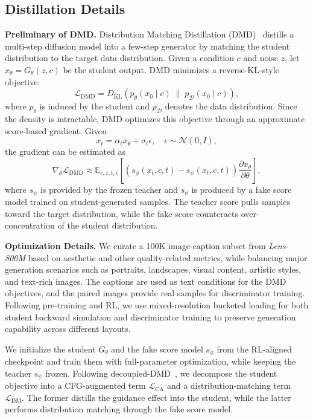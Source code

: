\subsection{Distillation Details}
\label{sec:Distill-Details}

\noindent\textbf{Preliminary of DMD.}
Distribution Matching Distillation (DMD)~\citep{dmd} distills a multi-step diffusion model into a few-step generator by matching the student distribution to the target data distribution. Given a condition $c$ and noise $z$, let $x_\theta=G_\theta(z,c)$ be the student output. DMD minimizes a reverse-KL-style objective:
\begin{equation*}
\mathcal{L}_{\mathrm{DMD}}
=
D_{\mathrm{KL}}
\left(
p_\theta(x_0 \mid c)
\;\|\;
p_{\mathcal{D}}(x_0 \mid c)
\right),
\end{equation*}
where $p_\theta$ is induced by the student and $p_{\mathcal{D}}$ denotes the data distribution. Since the density is intractable, DMD optimizes this objective through an approximate score-based gradient. Given
\begin{equation*}
x_t=\alpha_t x_\theta+\sigma_t\epsilon,
\quad
\epsilon\sim\mathcal{N}(0,I),
\end{equation*}
the gradient can be estimated as
\begin{equation*}
\nabla_\theta \mathcal{L}_{\mathrm{DMD}}
\approx
\mathbb{E}_{c,z,t,\epsilon}
\left[
\left(
s_\phi(x_t,c,t)
-
s_\psi(x_t,c,t)
\right)
\frac{\partial x_\theta}{\partial \theta}
\right],
\end{equation*}
where $s_\psi$ is provided by the frozen teacher and $s_\phi$ is produced by a fake score model trained on student-generated samples. The teacher score pulls samples toward the target distribution, while the fake score counteracts over-concentration of the student distribution.

\noindent\textbf{Optimization Details.}
We curate a 100K image-caption subset from \textit{Lens-800M} based on aesthetic and other quality-related metrics, while balancing major generation scenarios such as portraits, landscapes, visual content, artistic styles, and text-rich images. The captions are used as text conditions for the DMD objectives, and the paired images provide real samples for discriminator training. Following pre-training and RL, we use mixed-resolution bucketed loading for both student backward simulation and discriminator training to preserve generation capability across different layouts.

We initialize the student $G_\theta$ and the fake score model $s_\phi$ from the RL-aligned checkpoint and train them with full-parameter optimization, while keeping the teacher $s_\psi$ frozen. Following decoupled-DMD~\citep{decoupleddmd}, we decompose the student objective into a CFG-augmented term $\mathcal{L}_{\mathrm{CA}}$ and a distribution-matching term $\mathcal{L}_{\mathrm{DM}}$. The former distills the guidance effect into the student, while the latter performs distribution matching through the fake score model.

